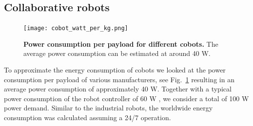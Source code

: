 \subsection{Collaborative robots}\label{sec:app_cobot_ener_consumption}
\begin{figure}[!h]
	\centering
	\texttt{[image: cobot\_watt\_per\_kg.png]}
	\caption{\textbf{Power consumption per payload for different cobots.} The average power consumption can be estimated at around 40 W.}
	\label{fig:cobot_watt_per_kg}
\end{figure}
To approximate the energy consumption of cobots we looked at the power consumption per payload of various manufacturers, see Fig.~\ref{fig:cobot_watt_per_kg} resulting in an average power consumption of approximately 40 W. Together with a typical power consumption of the robot controller of 60 W \cite{Heredia2023BreakingEnergyConsumption}, we consider a total of 100 W power demand. Similar to the industrial robots, the worldwide energy consumption was calculated assuming a 24/7 operation.



